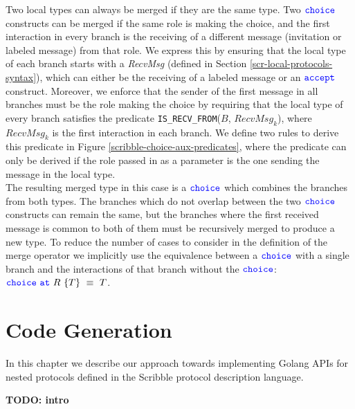 \documentclass[12pt,twoside]{report}
\begin{document}
Two local types can always be merged if they are the same type. Two ${\color{blue}\mathtt{choice}}$ constructs can be merged if the same role is making the choice, and the first interaction in every branch is the receiving of a different message (invitation or labeled message) from that role. We express this by ensuring that the local type of each branch starts with a \textit{RecvMsg} (defined in Section \ref{scr-local-protocols-syntax}), which can either be the receiving of a labeled message or an ${\color{blue}\mathtt{accept}}$ construct. Moreover, we enforce that the sender of the first message in all branches must be the role making the choice by requiring that the local type of every branch satisfies the predicate \texttt{IS\_RECV\_FROM}($\mathit{B}$, $\mathit{RecvMsg_k}$), where $\mathit{RecvMsg_k}$ is the first interaction in each branch. We define two rules to derive this predicate in Figure \ref{scribble-choice-aux-predicates}, where the predicate can only be derived if the role passed in as a parameter is the one sending the message in the local type.\\

The resulting merged type in this case is a ${\color{blue}\mathtt{choice}}$ which combines the branches from both types. The branches which do not overlap between the two ${\color{blue}\mathtt{choice}}$ constructs can remain the same, but the branches where the first received message is common to both of them must be recursively merged to produce a new type. To reduce the number of cases to consider in the definition of the merge operator we implicitly use the equivalence between a ${\color{blue}\mathtt{choice}}$ with a single branch and the interactions of that branch without the ${\color{blue}\mathtt{choice}}$: ${\color{blue}\mathtt{choice}}\ {\color{blue}\mathtt{at}}\ R\ \{T\}\ \equiv\ T$.\\
 
\chapter{Code Generation}

In this chapter we describe our approach towards implementing Golang APIs for nested protocols defined in the Scribble protocol description language. 

\textbf{TODO: intro}
\end{document}
